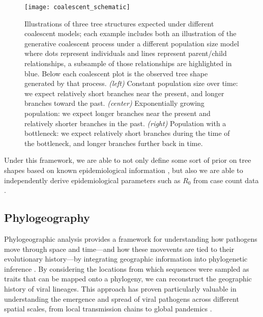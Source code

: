 \begin{figure}[ht]
  \centering
  \texttt{[image: coalescent\_schematic]}
  \caption[Demography effects tree shape]{Illustrations of three tree structures expected under different coalescent models; each example includes both an illustration of the generative coalescent process under a different population size model where dots represent individuals and lines represent parent/child relationships, a subsample of those relationships are highlighted in blue. Below each coalescent plot is the observed tree shape generated by that process. \textit{(left)} Constant population size over time: we expect relatively short branches near the present, and longer branches toward the past. \textit{(center)} Exponentially growing population: we expect longer branches near the present and relatively shorter branches in the past. \textit{(right)} Population with a bottleneck: we expect relatively short branches during the time of the bottleneck, and longer branches further back in time.
  }
  \label{fig:coalescentOverview}
\end{figure}

Under this framework, we are able to not only define some sort of prior on tree shapes based on known epidemiological information \citep{liu2009coalescent,hill2019bayesian}, but also we are able to independently derive epidemiological parameters such as $R_0$ from case count data \citep{frost2010viral,volz2013viral}.

\subsection{Phylogeography}\label{ssec:phylogeography}
Phylogeographic analysis provides a framework for understanding how pathogens move through space and time---and how these movevents are tied to their evolutionary history---by integrating geographic information into phylogenetic inference \citep{holmes2008evolutionary}.
By considering the locations from which sequences were sampled as traits that can be mapped onto a phylogeny, we can reconstruct the geographic history of viral lineages.
This approach has proven particularly valuable in understanding the emergence and spread of viral pathogens across different spatial scales, from local transmission chains to global pandemics \citep{bourhy2008origin,cuevas2012phylogeography,black2019genomic,truong2022phylodynamics,du2021establishment}.

